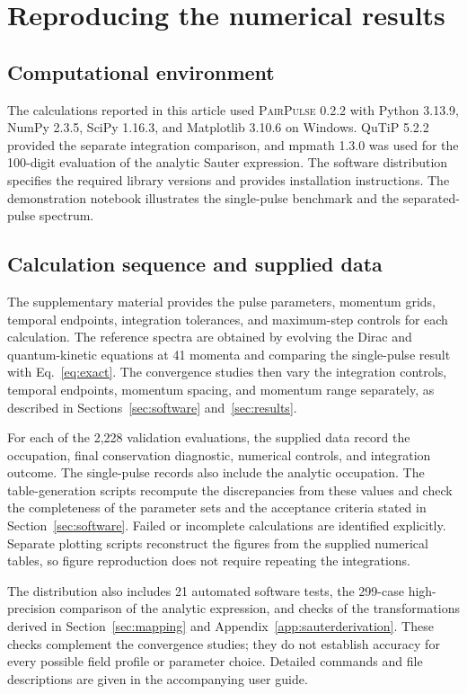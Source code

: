 \documentclass[11pt,a4paper]{article}
\newcommand{\PairPulse}{\textsc{PairPulse}}
\begin{document}
\FloatBarrier
\appendix
\section{Reproducing the numerical results}
\label{app:reproduction}

\subsection{Computational environment}
The calculations reported in this article used \PairPulse{} 0.2.2 with Python 3.13.9, NumPy 2.3.5, SciPy 1.16.3, and Matplotlib 3.10.6 on Windows. QuTiP 5.2.2 provided the separate integration comparison, and mpmath 1.3.0 was used for the 100-digit evaluation of the analytic Sauter expression. The software distribution specifies the required library versions and provides installation instructions. The demonstration notebook illustrates the single-pulse benchmark and the separated-pulse spectrum.

\subsection{Calculation sequence and supplied data}
The supplementary material provides the pulse parameters, momentum grids, temporal endpoints, integration tolerances, and maximum-step controls for each calculation. The reference spectra are obtained by evolving the Dirac and quantum-kinetic equations at 41 momenta and comparing the single-pulse result with Eq.~\eqref{eq:exact}. The convergence studies then vary the integration controls, temporal endpoints, momentum spacing, and momentum range separately, as described in Sections~\ref{sec:software} and~\ref{sec:results}.

For each of the 2,228 validation evaluations, the supplied data record the occupation, final conservation diagnostic, numerical controls, and integration outcome. The single-pulse records also include the analytic occupation. The table-generation scripts recompute the discrepancies from these values and check the completeness of the parameter sets and the acceptance criteria stated in Section~\ref{sec:software}. Failed or incomplete calculations are identified explicitly. Separate plotting scripts reconstruct the figures from the supplied numerical tables, so figure reproduction does not require repeating the integrations.

The distribution also includes 21 automated software tests, the 299-case high-precision comparison of the analytic expression, and checks of the transformations derived in Section~\ref{sec:mapping} and Appendix~\ref{app:sauterderivation}. These checks complement the convergence studies; they do not establish accuracy for every possible field profile or parameter choice. Detailed commands and file descriptions are given in the accompanying user guide.
\end{document}
